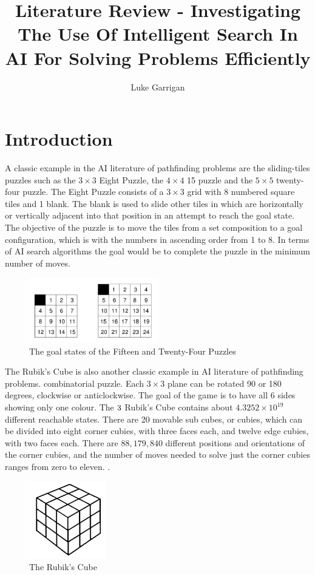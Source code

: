 \documentclass[review]{cmpreport}
\title{Literature Review - Investigating The Use Of Intelligent Search In AI For Solving Problems Efficiently}
\author{Luke Garrigan}
\begin{document}
\section{Introduction}




A classic example in the AI literature of pathfinding problems are the sliding-tiles puzzles such as the $3\times3$ Eight Puzzle, the $4\times4$ 15 puzzle and the $5\times5$ twenty-four puzzle. The Eight Puzzle consists of a $3\times3$ grid with 8 numbered square tiles and 1 blank. The blank is used to slide other tiles in which are horizontally or vertically adjacent into that position in an attempt to reach the goal state. The objective of the puzzle is to move the tiles from a set composition to a goal configuration, which is with the numbers in ascending order from 1 to 8. In terms of AI search algorithms the goal would be to complete the puzzle in the minimum number of moves.  

\begin{figure}[ht]
	\centering
	\includegraphics[width=0.5\textwidth]{sliding_tile}
	\captionsetup{justification=centering}
	\caption{The goal states of the Fifteen and Twenty-Four Puzzles}
\end{figure}
The Rubik's Cube is also another classic example in AI literature of pathfinding problems. combinatorial puzzle. Each $3\times3$ plane can be rotated 90 or 180 degrees, clockwise or anticlockwise. The goal of the game is to have all 6 sides showing only one colour. The $3\time3\time3$ Rubik's Cube contains about $4.3252\times10^{19}$ different reachable states. There are 20 movable sub cubes, or cubies, which can be divided into eight corner cubies, with three faces each, and twelve edge cubies, with two faces each. There are $88,179,840$ different positions and orientations of the corner cubies, and the number of moves needed to solve just the corner cubies ranges from zero to eleven. \citep{DBLP:journals/corr/abs-1107-0050}.

\begin{figure}[ht]
	\centering
	\includegraphics[width=0.3\textwidth]{rubiks}
	\captionsetup{justification=centering}
	\caption{The Rubik's Cube}
\end{figure}
\end{document}

